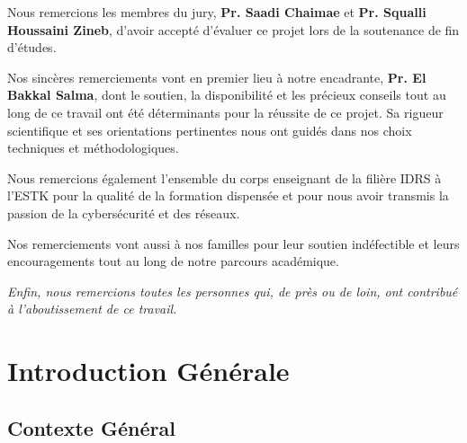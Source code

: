 \documentclass[12pt,a4paper,openany]{report}
\newif\ifshowpagenumbers
\newcommand{\showpagenumbers}{\showpagenumberstrue\pagestyle{fancy}}
\begin{document}
	Nous remercions les membres du jury, \textbf{Pr. Saadi Chaimae} et \textbf{Pr. Squalli Houssaini Zineb}, d'avoir accepté d'évaluer ce projet lors de la soutenance de fin d'études.
	
	\vspace{0.9cm}
	
	Nos sincères remerciements vont en premier lieu à notre encadrante, \textbf{Pr. El Bakkal Salma}, dont le soutien, la disponibilité et les précieux conseils tout au long de ce travail ont été déterminants pour la réussite de ce projet. Sa rigueur scientifique et ses orientations pertinentes nous ont guidés dans nos choix techniques et méthodologiques.
	
	\vspace{0.9cm}
	
	Nous remercions également l'ensemble du corps enseignant de la filière IDRS à l'ESTK pour la qualité de la formation dispensée et pour nous avoir transmis la passion de la cybersécurité et des réseaux.
	
	\vspace{0.9cm}
	
	Nos remerciements vont aussi à nos familles pour leur soutien indéfectible et leurs encouragements tout au long de notre parcours académique.
	
	\vspace{0.9cm}
	
	\textit{Enfin, nous remercions toutes les personnes qui, de près ou de loin, ont contribué à l'aboutissement de ce travail.}
	\endgroup
	
	\newpage
	
	\tableofcontents
	\newpage
	\listoffigures
	\listoftables
	\newpage
	
	\cleardoublepage
	\showpagenumbers
	\setcounter{page}{1}
	
	
	\chapter{Introduction Générale}
	\label{chap:introduction}
	
	\section{Contexte Général}
	
\end{document}
